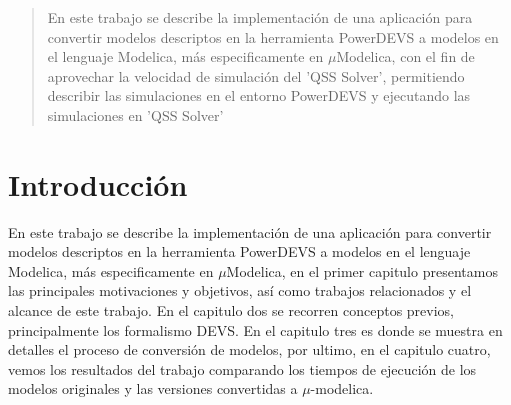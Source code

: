 \documentclass[a4paper,	11pt]{report}
\begin{document}
\tableofcontents

\begin{abstract}
En este trabajo se describe la implementación de una aplicación para convertir modelos descriptos en la herramienta PowerDEVS\cite{BK11} a modelos en el lenguaje Modelica\cite{Fritzson02modelica--}, más especificamente en $\mu$Modelica\cite{Ber12}, con el fin de aprovechar la velocidad de simulación del 'QSS Solver', permitiendo describir las simulaciones en el entorno PowerDEVS y ejecutando las simulaciones en 'QSS Solver'\cite{Fer12}
\end{abstract}


\chapter{Introducción}

En este trabajo se describe la implementación de una aplicación para convertir modelos descriptos en la herramienta PowerDEVS\cite{BK11} a modelos en el lenguaje Modelica\cite{Fritzson02modelica--}, más especificamente en $\mu$Modelica\cite{Ber12}, en el primer capitulo presentamos las principales motivaciones y objetivos, así como trabajos relacionados y el alcance de este trabajo. En el capitulo dos se recorren conceptos previos, principalmente los formalismo DEVS. En el capitulo tres es donde se muestra en detalles el proceso de conversión de modelos, por ultimo, en el capitulo cuatro, vemos los resultados del trabajo comparando los tiempos de ejecución de los modelos originales y las versiones convertidas a $\mu$-modelica.
\end{document}

